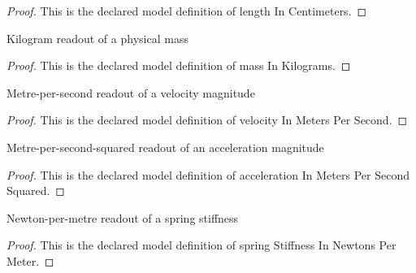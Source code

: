 \begin{proof}
  This is the declared model definition of length In Centimeters.
\end{proof}
\begin{definition}
  \label{def:physics:phyx-mini-0281:phyxminiproblems-problemphyxmini0281-massinkilograms}
  Kilogram readout of a physical mass
\end{definition}
\begin{proof}
  This is the declared model definition of mass In Kilograms.
\end{proof}
\begin{definition}
  \label{def:physics:phyx-mini-0281:phyxminiproblems-problemphyxmini0281-velocityinmeterspersecond}
  Metre-per-second readout of a velocity magnitude
\end{definition}
\begin{proof}
  This is the declared model definition of velocity In Meters Per Second.
\end{proof}
\begin{definition}
  \label{def:physics:phyx-mini-0281:phyxminiproblems-problemphyxmini0281-accelerationinmeterspersecondsquared}
  Metre-per-second-squared readout of an acceleration magnitude
\end{definition}
\begin{proof}
  This is the declared model definition of acceleration In Meters Per Second Squared.
\end{proof}
\begin{definition}
  \label{def:physics:phyx-mini-0281:phyxminiproblems-problemphyxmini0281-springstiffnessinnewtonspermeter}
  Newton-per-metre readout of a spring stiffness
\end{definition}
\begin{proof}
  This is the declared model definition of spring Stiffness In Newtons Per Meter.
\end{proof}
